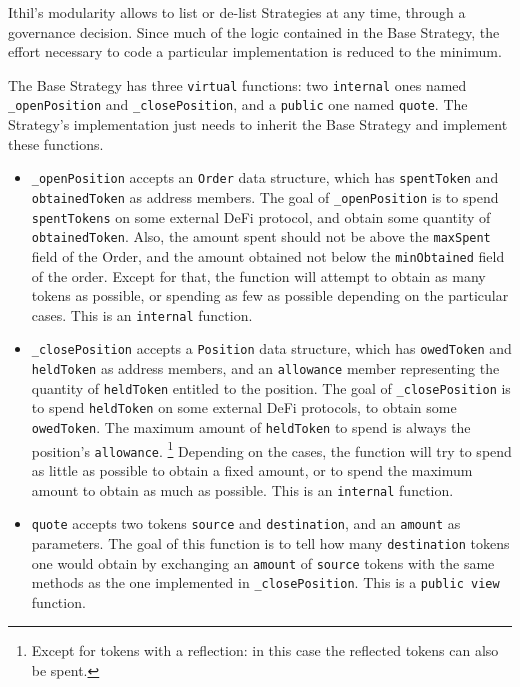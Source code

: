 \documentclass[a4paper,10 pt]{article}
\theoremstyle{definition}
\begin{document}
Ithil's modularity allows to list or de-list Strategies at any time, through a governance decision. Since much of the logic contained in the Base Strategy, the effort necessary to code a particular implementation is reduced to the minimum.

The Base Strategy has three \verb|virtual| functions: two \verb|internal| ones named \verb|_openPosition| and \verb|_closePosition|, and a \verb|public| one named \verb|quote|. The Strategy's implementation just needs to inherit the Base Strategy and implement these functions.

\begin{itemize}
\item \verb|_openPosition| accepts an \verb|Order| data structure, which has \verb|spentToken| and \verb|obtainedToken| as address members. The goal of \verb|_openPosition| is to spend \verb|spentTokens| on some external DeFi protocol, and obtain some quantity of \verb|obtainedToken|. Also, the amount spent should not be above the \verb|maxSpent| field of the Order, and the amount obtained not below the \verb|minObtained| field of the order. Except for that, the function will attempt to obtain as many tokens as possible, or spending as few as possible depending on the particular cases. This is an \verb|internal| function.
\item \verb|_closePosition| accepts a \verb|Position| data structure, which has \verb|owedToken| and \verb|heldToken| as address members, and an \verb|allowance| member representing the quantity of \verb|heldToken| entitled to the position. The goal of \verb|_closePosition| is to spend \verb|heldToken| on some external DeFi protocols, to obtain some \verb|owedToken|. The maximum amount of \verb|heldToken| to spend is always the position's \verb|allowance|. \footnote{Except for tokens with a reflection: in this case the reflected tokens can also be spent.} Depending on the cases, the function will try to spend as little as possible to obtain a fixed amount, or to spend the maximum amount to obtain as much as possible. This is an \verb|internal| function.
\item \verb|quote| accepts two tokens \verb|source| and \verb|destination|, and an \verb|amount| as parameters. The goal of this function is to tell how many \verb|destination| tokens one would obtain by exchanging an \verb|amount| of \verb|source| tokens with the same methods as the one implemented in \verb|_closePosition|. This is a \verb|public view| function.
\end{itemize}
\end{document}
